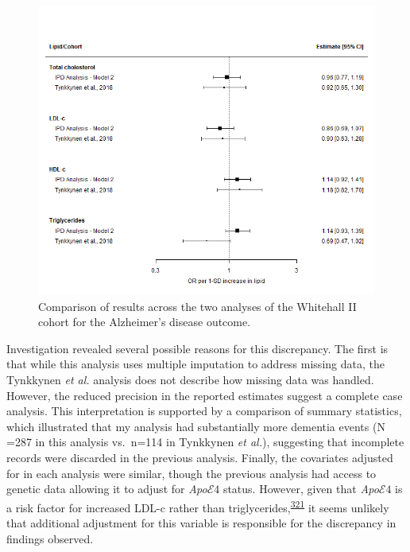\documentclass[a4paper, twoside]{templates/ociamthesis}
\begin{document}
~





\begin{figure}[H]
\includegraphics[width=1\linewidth]{figures/ipd/whitehall_comparison_ad} \caption[Comparison of results across the two analyses of the Whitehall II cohort]{Comparison of results across the two analyses of the Whitehall II cohort for the Alzheimer's disease outcome.}\label{fig:whitehallComparisonAd}
\end{figure}

Investigation revealed several possible reasons for this discrepancy. The first is that while this analysis uses multiple imputation to address missing data, the Tynkkynen \emph{et al.} analysis does not describe how missing data was handled. However, the reduced precision in the reported estimates suggest a complete case analysis. This interpretation is supported by a comparison of summary statistics, which illustrated that my analysis had substantially more dementia events (N =287 in this analysis vs.~n=114 in Tynkkynen \emph{et al.}), suggesting that incomplete records were discarded in the previous analysis. Finally, the covariates adjusted for in each analysis were similar, though the previous analysis had access to genetic data allowing it to adjust for \emph{Apo}\(\mathcal{E}4\) status. However, given that \emph{Apo}\(\mathcal{E}4\) is a risk factor for increased LDL-c rather than triglycerides,\textsuperscript{\protect\hyperlink{ref-bennet2007}{321}} it seems unlikely that additional adjustment for this variable is responsible for the discrepancy in findings observed.
\end{document}

